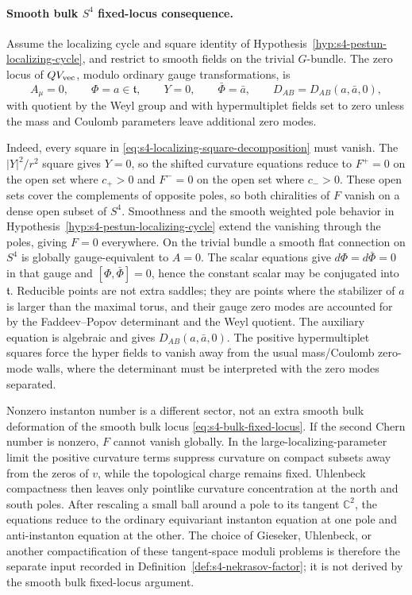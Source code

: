 \paragraph{Smooth bulk \(S^4\) fixed-locus consequence.}
\label{par:s4-smooth-bulk-fixed-locus}
Assume the localizing cycle and square identity of
Hypothesis~\ref{hyp:s4-pestun-localizing-cycle}, and restrict to smooth fields
on the trivial \(G\)-bundle.  The zero locus of \(QV_{\rm vec}\), modulo
ordinary gauge transformations, is
\begin{equation}
  A_\mu=0,\qquad
  \Phi=a\in\mathfrak t,\qquad
  Y=0,\qquad
  \bar\Phi=\bar a,\qquad
  D_{AB}=D_{AB}(a,\bar a,0),
  \label{eq:s4-bulk-fixed-locus}
\end{equation}
with quotient by the Weyl group and with hypermultiplet fields set to zero
unless the mass and Coulomb parameters leave additional zero modes.

Indeed, every square in \eqref{eq:s4-localizing-square-decomposition} must
vanish.  The
\(|Y|^2/r^2\) square gives \(Y=0\), so the shifted curvature equations reduce
to \(F^+=0\) on the open set where \(c_+>0\) and \(F^-=0\) on the open set
where \(c_->0\).  These open sets cover the complements of opposite poles, so
both chiralities of \(F\) vanish on a dense open subset of \(S^4\).  Smoothness
and the smooth weighted pole behavior in
Hypothesis~\ref{hyp:s4-pestun-localizing-cycle} extend the vanishing through
the poles, giving \(F=0\) everywhere.  On the trivial bundle a smooth flat
connection on \(S^4\) is globally gauge-equivalent to \(A=0\).  The scalar
equations give \(d\Phi=d\bar\Phi=0\) in that gauge and
\([\Phi,\bar\Phi]=0\), hence the constant scalar may be conjugated into
\(\mathfrak t\).  Reducible points are not extra saddles; they are points where
the stabilizer of \(a\) is larger than the maximal torus, and their gauge zero
modes are accounted for by the Faddeev--Popov determinant and the Weyl quotient.
The auxiliary equation is algebraic and gives \(D_{AB}(a,\bar a,0)\).  The
positive hypermultiplet squares force the hyper fields to vanish away from the
usual mass/Coulomb zero-mode walls, where the determinant must be interpreted
with the zero modes separated.

Nonzero instanton number is a different sector, not an extra smooth bulk
deformation of the smooth bulk locus \eqref{eq:s4-bulk-fixed-locus}.  If the
second Chern number is nonzero, \(F\) cannot vanish globally.  In the
large-localizing-parameter limit the positive curvature terms suppress
curvature on compact subsets away from the zeros of \(v\), while the topological
charge remains fixed.  Uhlenbeck compactness then leaves only pointlike
curvature concentration at the north and south poles.  After rescaling a small
ball around a pole to its tangent \(\mathbb C^2\), the equations reduce to the
ordinary equivariant instanton equation at one pole and anti-instanton equation
at the other.  The choice of Gieseker, Uhlenbeck, or another compactification
of these tangent-space moduli problems is therefore the separate input recorded
in Definition~\ref{def:s4-nekrasov-factor}; it is not derived by the smooth bulk
fixed-locus argument.

